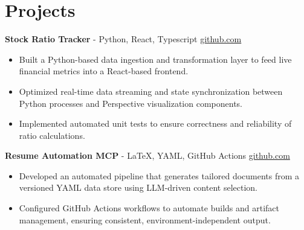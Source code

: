\documentclass[11pt]{article}       %
\begin{document}
\vspace{-18.5pt}

\section*{Projects}

\textbf{Stock Ratio Tracker}{ - Python, React, Typescript} \hfill \href{https://github.com/Monica20030707/Trading-Dashboard_UI}{github.com} \\
\vspace{-9pt}
\begin{itemize}
  \item Built a Python-based data ingestion and transformation layer to feed live financial metrics into a React-based frontend.
  \item Optimized real-time data streaming and state synchronization between Python processes and Perspective visualization components.
  \item Implemented automated unit tests to ensure correctness and reliability of ratio calculations.
\end{itemize}

\textbf{Resume Automation MCP}{ - LaTeX, YAML, GitHub Actions} \hfill \href{https://github.com/Monica20030707/Tex_OrangeLeaf-mcp}{github.com} \\
\vspace{-9pt}
\begin{itemize}
  \item Developed an automated pipeline that generates tailored documents from a versioned YAML data store using LLM-driven content selection.
  \item Configured GitHub Actions workflows to automate builds and artifact management, ensuring consistent, environment-independent output.
\end{itemize}

\end{document}
